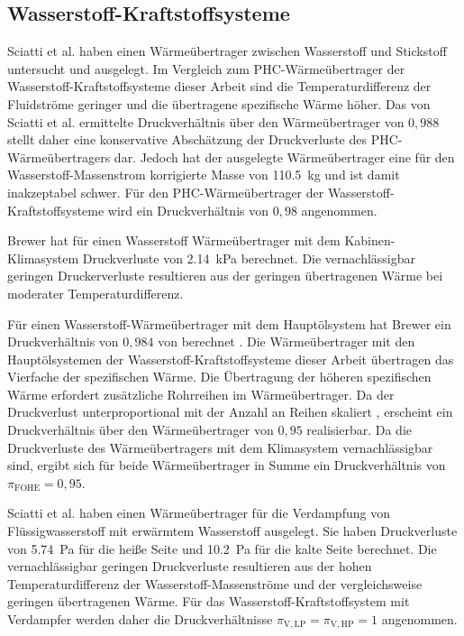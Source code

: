 \subsection{Wasserstoff-Kraftstoffsysteme}

Sciatti et al. \cite{Sciatti.2025} haben einen Wärmeübertrager zwischen Wasserstoff und Stickstoff untersucht und ausgelegt. Im Vergleich zum PHC-Wärmeübertrager der Wasserstoff-Kraftstoffsysteme dieser Arbeit sind die Temperaturdifferenz der Fluidströme geringer und die übertragene spezifische Wärme höher. Das von Sciatti et al. ermittelte Druckverhältnis über den Wärmeübertrager von $0,988$ stellt daher eine konservative Abschätzung der Druckverluste des PHC-Wärmeübertragers dar. Jedoch hat der ausgelegte Wärmeübertrager eine für den Wasserstoff-Massenstrom korrigierte Masse von \SI{110.5}{\kg} und ist damit inakzeptabel schwer. Für den PHC-Wärmeübertrager der Wasserstoff-Kraftstoffsysteme wird ein Druckverhältnis von $0,98$ angenommen.

Brewer \cite{Brewer.1991} hat für einen Wasserstoff Wärmeübertrager mit dem Kabinen-Klimasystem Druckverluste von \SI{2.14}{\kilo\Pa} berechnet. Die vernachlässigbar geringen Druckerverluste resultieren aus der geringen übertragenen Wärme bei moderater Temperaturdifferenz.

Für einen Wasserstoff-Wärmeübertrager mit dem Hauptölsystem hat Brewer ein Druckverhältnis von $0,984$ von berechnet \cite{Brewer.1991}. Die Wärmeübertrager mit den Hauptölsystemen der Wasserstoff-Kraftstoffsysteme dieser Arbeit übertragen das Vierfache der spezifischen Wärme. Die Übertragung der höheren spezifischen Wärme erfordert zusätzliche Rohrreihen im Wärmeübertrager. Da der Druckverlust unterproportional mit der Anzahl an Reihen skaliert \cite{.2013b}, erscheint ein Druckverhältnis über den Wärmeübertrager von $0,95$ realisierbar. Da die Druckverluste des Wärmeübertragers mit dem Klimasystem vernachlässigbar sind, ergibt sich für beide Wärmeübertrager in Summe ein Druckverhältnis von $\pi_{\mathrm{FOHE}}=0,95$.

Sciatti et al. \cite{Sciatti.2025} haben einen Wärmeübertrager für die Verdampfung von Flüssigwasserstoff mit erwärmtem Wasserstoff ausgelegt. Sie haben Druckverluste von \SI{5.74}{\Pa} für die heiße Seite und \SI{10.2}{\Pa} für die kalte Seite berechnet. Die vernachlässigbar geringen Druckverluste resultieren aus der hohen Temperaturdifferenz der Wasserstoff-Massenströme und der vergleichsweise geringen übertragenen Wärme. Für das Wasserstoff-Kraftstoffsystem mit Verdampfer werden daher die Druckverhältnisse $\pi_{\mathrm{V,LP}}=\pi_{\mathrm{V,HP}}=1$ angenommen.

